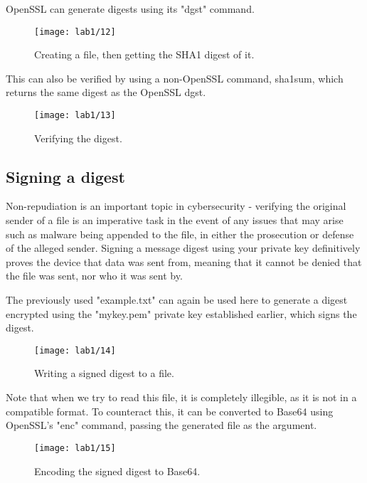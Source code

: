 OpenSSL can generate digests using its "dgst" command.
\begin{figure}[H]
    \centering
    \texttt{[image: lab1/12]}
    \caption{Creating a file, then getting the SHA1 digest of it.}
    \label{fig:digest}
\end{figure}

This can also be verified by using a non-OpenSSL command, sha1sum, which returns the same digest as the
OpenSSL dgst.

\begin{figure}[H]
    \centering
    \texttt{[image: lab1/13]}
    \caption{Verifying the digest.}
    \label{fig:digestVerify}
\end{figure}

\pagebreak

\subsection{Signing a digest}\label{subsec:SignDigest}
Non-repudiation is an important topic in cybersecurity - verifying the original sender of a file is an
imperative task in the event of any issues that may arise such as malware being appended to the file,
in either the prosecution or defense of the alleged sender.
Signing a message digest using your private key definitively proves the device that data was sent from,
meaning that it cannot be denied that the file was sent, nor who it was sent by.

The previously used "example.txt" can again be used here to generate a digest encrypted using the "mykey.pem"
private key established earlier, which signs the digest.

\begin{figure}[H]
    \centering
    \texttt{[image: lab1/14]}
    \caption{Writing a signed digest to a file.}
    \label{fig:writeDigest}
\end{figure}

Note that when we try to read this file, it is completely illegible, as it is not in a compatible format.
To counteract this, it can be converted to Base64 using OpenSSL's "enc" command, passing the generated file
as the argument.

\begin{figure}[H]
    \centering
    \texttt{[image: lab1/15]}
    \caption{Encoding the signed digest to Base64.}
    \label{fig:base64Digest}
\end{figure}

